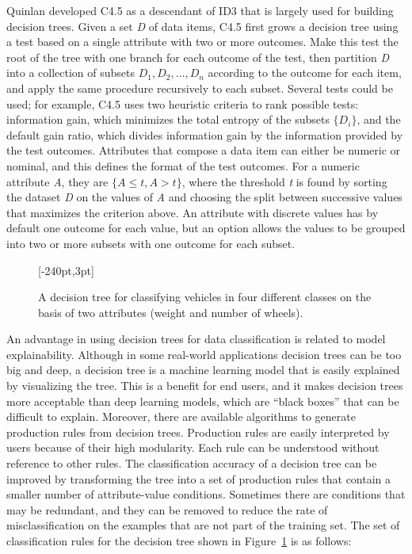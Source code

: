 Quinlan developed C4.5 as a descendant of ID3 that is largely used for building decision trees. Given a set \textit{D} of data items, C4.5 first grows a decision tree using a test based on a single attribute with two or more outcomes. Make this test the root of the tree with one branch for each outcome of the test, then partition \textit{D} into a collection of subsets $D{}_{1}, D{}_{2}, \ldots , D{}_{n}$ according to the outcome for each item, and apply the same procedure recursively to each subset. Several tests could be used; for example, C4.5 uses two heuristic criteria to rank possible tests: information gain, which minimizes the total entropy of the subsets $\{D_{i}\}$, and the default gain ratio, which divides information gain by the information provided by the test outcomes. Attributes that compose a data item can either be numeric or nominal, and this defines the format of the test outcomes. For a numeric attribute \textit{A}, they are $\{A \leq t, A > t\}$, where the threshold \textit{t} is found by sorting the dataset \textit{D} on the values of \textit{A} and choosing the split between successive values that maximizes the criterion above. An attribute with discrete values has by default one outcome for each value, but an option allows the values to be grouped into two or more subsets with one outcome for each subset.


\begin{figure}[t!]
[-240pt,3pt]
\caption{\label{fig:4.3}A decision tree for classifying vehicles in four different classes on the basis of two attributes (weight and number of wheels).}
\end{figure}

An advantage in using decision trees for data classification is related to model explainability. Although in some real-world applications decision trees can be too big and deep, a decision tree is a machine learning model that is easily explained by visualizing the tree. This is a benefit for end users, and it makes decision trees more acceptable than deep learning models, which are ``black boxes'' that can be difficult to explain. Moreover, there are available algorithms to generate production rules from decision trees. Production rules are easily interpreted by users because of their high modularity. Each rule can be understood without reference to other rules. The classification accuracy of a decision tree can be improved by transforming the tree into a set of production rules that contain a smaller number of attribute-value conditions. Sometimes there are conditions that may be redundant, and they can be removed to reduce the rate of misclassification on the examples that are not part of the training set. The set of classification rules for the decision tree shown in Figure~\ref{fig:4.3} is as follows:

